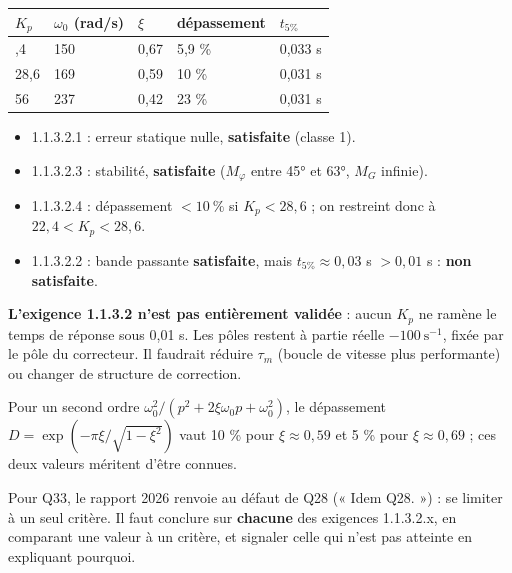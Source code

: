 \documentclass[11pt,a4paper]{article}
\providecommand{\tightlist}{\setlength{\itemsep}{0pt}\setlength{\parskip}{0pt}}
\begin{document}
\begin{longtable}[]{@{}lllll@{}}
\toprule\noalign{}
\(K_p\) & \(\omega_0\) (rad/s) & \(\xi\) & dépassement & \(t_{5\%}\) \\
\midrule\noalign{}
\endhead
\bottomrule\noalign{}
\endlastfoot
22,4 & 150 & 0,67 & 5,9 \% & 0,033 s \\
28,6 & 169 & 0,59 & 10 \% & 0,031 s \\
56 & 237 & 0,42 & 23 \% & 0,031 s \\
\end{longtable}

\begin{itemize}
\tightlist
\item
  1.1.3.2.1 : erreur statique nulle, \textbf{satisfaite} (classe 1).
\item
  1.1.3.2.3 : stabilité, \textbf{satisfaite} (\(M_\varphi\) entre 45° et 63°, \(M_G\) infinie).
\item
  1.1.3.2.4 : dépassement \(< 10\ \%\) si \(K_p < 28{,}6\) ; on restreint donc à \(22{,}4 < K_p < 28{,}6\).
\item
  1.1.3.2.2 : bande passante \textbf{satisfaite}, mais \(t_{5\%} \approx 0{,}03\) s \(> 0{,}01\) s : \textbf{non satisfaite}.
\end{itemize}

\textbf{L'exigence 1.1.3.2 n'est pas entièrement validée} : aucun \(K_p\) ne ramène le temps de réponse sous 0,01 s. Les pôles restent à partie réelle \(-100\ \text{s}^{-1}\), fixée par le pôle du correcteur. Il faudrait réduire \(\tau_m\) (boucle de vitesse plus performante) ou changer de structure de correction.

\begin{methode}

Pour un second ordre \(\omega_0^2/(p^2 + 2\xi\omega_0 p + \omega_0^2)\), le dépassement \(D = \exp\left(-\pi\xi/\sqrt{1 - \xi^2}\right)\) vaut 10 \% pour \(\xi \approx 0{,}59\) et 5 \% pour \(\xi \approx 0{,}69\) ; ces deux valeurs méritent d'être connues.

\end{methode}

\begin{jury}

Pour Q33, le rapport 2026 renvoie au défaut de Q28 (« Idem Q28. ») : se limiter à un seul critère. Il faut conclure sur \textbf{chacune} des exigences 1.1.3.2.x, en comparant une valeur à un critère, et signaler celle qui n'est pas atteinte en expliquant pourquoi.

\end{jury}
\end{document}
